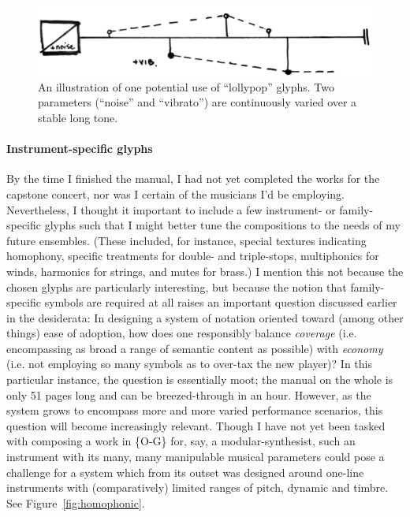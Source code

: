     \begin{figure}
        \centering
        \includegraphics[width=.8\textwidth]{images/chapter4/02-lolly5.png}
        \captionsetup{width=.5\textwidth}
        \caption[An illustration of one potential use of ``lollypop'' glyphs. Two parameters (``noise'' and ``vibrato'') are continuously varied over a stable long tone.]{An illustration of one potential use of ``lollypop'' glyphs. Two parameters (``noise'' and ``vibrato'') are continuously varied over a stable long tone.\footnotemark}
        \label{fig:lollypop}
    \end{figure}

    \paragraph{Instrument-specific glyphs} By the time I finished the manual, I had not yet completed the works for the capstone concert, nor was I certain of the musicians I'd be employing. Nevertheless, I thought it important to include a few instrument- or family- specific glyphs such that I might better tune the compositions to the needs of my future ensembles. (These included, for instance, special textures indicating homophony, specific treatments for double- and triple-stops, multiphonics for winds, harmonics for strings, and mutes for brass.) I mention this not because the chosen glyphs are particularly interesting, but because the notion that family-specific symbols are required at all raises an important question discussed earlier in the desiderata: In designing a system of notation oriented toward (among other things) ease of adoption, how does one responsibly balance \textit{coverage} (i.e. encompassing as broad a range of semantic content as possible) with \textit{economy} (i.e. not employing so many symbols as to over-tax the new player)? In this particular instance, the question is essentially moot; the manual on the whole is only 51 pages long and can be breezed-through in an hour. However, as the system grows to encompass more and more varied performance scenarios, this question will become increasingly relevant. Though I have not yet been tasked with composing a work in \{O-G\} for, say, a modular-synthesist, such an instrument with its many, many manipulable musical parameters could pose a challenge for a system which from its outset was designed around one-line instruments with (comparatively) limited ranges of pitch, dynamic and timbre. See Figure~\ref{fig:homophonic}.

